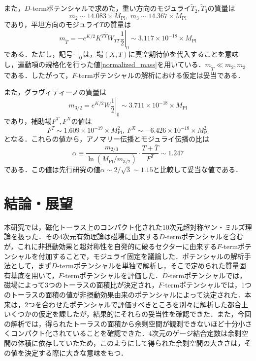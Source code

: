 \documentclass[a4paper,uplatex,dvipdfmx]{jsarticle}
\theoremstyle{definition}
\begin{document}
また，$D$-termポテンシャルで求めた，重い方向のモジュライ$\tilde{T}_{2},\tilde{T}_{3}$の質量は
\begin{equation}
   m_{2}
   \sim
   14.083
   \times
   M_{\text{Pl}}
   ,\ 
   m_{3}
   \sim
   14.367
   \times
   M_{\text{Pl}}
   \nonumber
\end{equation}
であり，平坦方向のモジュライ$\tilde{T}$の質量は
\begin{equation}
   m_{\tilde{T}}
   =
   -e^{K/2}K^{T\bar{T}}W_{TT}
   \left.\frac{1}{2}\right|_{0}
   \sim
   3.117
   \times
   10^{-18}
   \times
   M_{\text{Pl}}
   \nonumber
\end{equation}
である．ただし，記号$\cdot\left.\vphantom{\frac{1}{2}}\right|_{0}$は，場$(X,T)$に真空期待値を代入することを意味し，運動項の規格化を行った値\eqref{normalized_mass}を用いている．$m_{\tilde{T}}\ll m_{2}, m_{3}$である．したがって，$F$-termポテンシャルの解析における仮定は妥当である．

また，グラヴィティーノの質量は
\begin{equation}
   m_{3/2}
   =
   e^{K/2}W
   \left.\frac{1}{2}\right|_{0}
   \sim
   3.711\times 10^{-18}
   \times
   M_{\text{Pl}}
   \nonumber
\end{equation}
であり，補助場$F^{T},F^{X}$の値は
\begin{equation}
   F^{T}
   \sim
   1.609\times 10^{-19}
   \times
   M_{\text{Pl}}^2
   ,\ 
   F^{X}
   \sim
   -6.426\times 10^{-18}
   \times
   M_{\text{Pl}}^2
   \nonumber
\end{equation}
となる．これらの値から，アノマリー伝播とモジュライ伝播の比\cite{Choi_PhenomenologyMixed_2005}は
\begin{equation}
   \alpha
   \equiv
   \frac{m_{2/3}}{\ln(M_{\text{Pl}}/m_{3/2})}
   \cdot
   \frac{T+\bar{T}}{F^{T}}
   \sim
   1.247
   \nonumber
\end{equation}
である．この値は先行研究\cite{Abe_ModuliStabilization_2007a}の値$\alpha\sim 2/\sqrt{3}\sim 1.15$と比較して妥当な値である．


\section{結論・展望}

本研究では，磁化トーラス上のコンパクト化された10次元超対称ヤン・ミルズ理論を扱った．その4次元有効理論は磁場に由来する$D$-termポテンシャルを含むが，これに非摂動効果と超対称性を自発的に破るセクターに由来する$F$-termポテンシャルを付加することで，モジュライ固定を議論した．ポテンシャルの解析手法として，まず$D$-termポテンシャルを単独で解析し，そこで定められた質量固有基底を用いて，$F$-termポテンシャルを評価した．$D$-termポテンシャルでは，磁場によって3つのトーラスの面積比が決定され，$F$-termポテンシャルでは，1つのトーラスの面積の値が非摂動効果由来のポテンシャルによって決定された．本来は，2つを合わせたポテンシャルで評価すべきところを別々に解析した都合上いくつかの仮定を課したが，結果的にそれらの妥当性を確認できた．また，今回の解析では，得られたトーラスの面積から余剰空間が観測できないほど十分小さくコンパクト化されていることを確認できた．4次元のゲージ結合定数は余剰空間の体積に依存していたため，このようにして得られた余剰空間の大きさは，その値を決定する際に大きな意味をもつ．
\end{document}
